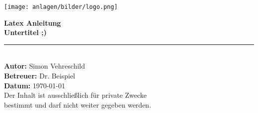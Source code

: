 \begin{titlepage}  %
    \begin{center}

        \vspace*{0.5cm}  %

        \texttt{[image: anlagen/bilder/logo.png]}
        \vspace{1cm}  %

        {\Huge \textbf{Latex Anleitung}} \\[0.5cm]
        {\Large \textbf{Untertitel ;)}} \\[1.5cm]

        \rule{12cm}{0.5pt} \\[1.5cm]  %

        \textbf{\Large Autor:} \Large Simon Vehreschild \\[0.5cm]
        \textbf{\Large Betreuer:} \Large Dr. Beispiel \\[0.5cm]
        \textbf{\Large Datum:} \Large \today \\[3cm]

        {Der Inhalt ist ausschließlich für private Zwecke} \\
        {bestimmt und darf nicht weiter gegeben werden.} \\

        \vfill  %
    \end{center}
\end{titlepage}